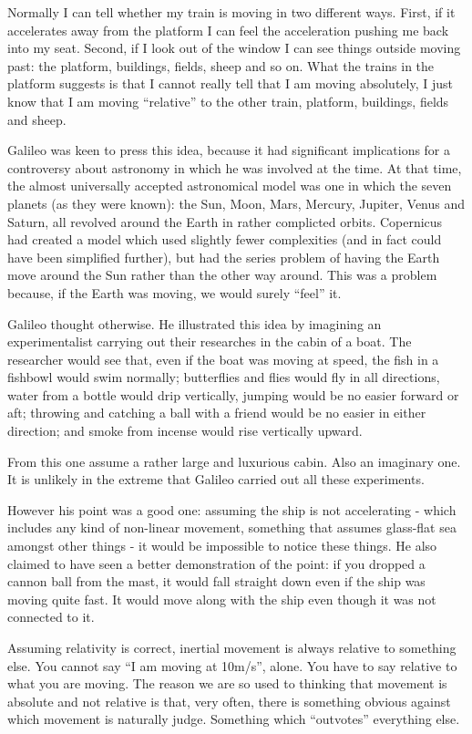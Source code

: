 \documentclass[a4paper]{report}
\begin{document}
Normally I can tell whether my train is moving in two different ways. First, if it accelerates away from the platform I can feel the acceleration pushing me back into my seat. Second, if I look out of the window I can see things outside moving past: the platform, buildings, fields, sheep and so on. What the trains in the platform suggests is that I cannot really tell that I am moving absolutely, I just know that I am moving ``relative'' to the other train, platform, buildings, fields and sheep.

Galileo was keen to press this idea, because it had significant implications for a controversy about astronomy in which he was involved at the time. At that time, the almost universally accepted astronomical model was one in which the seven planets (as they were known): the Sun, Moon, Mars, Mercury, Jupiter, Venus and Saturn, all revolved around the Earth in rather complicted orbits. Copernicus had created a model which used slightly fewer complexities (and in fact could have been simplified further), but had the series problem of having the Earth move around the Sun rather than the other way around. This was a problem because, if the Earth was moving, we would surely ``feel'' it.

Galileo thought otherwise. He illustrated this idea by imagining an experimentalist carrying out their researches in the cabin of a boat. The researcher would see that, even if the boat was moving at speed, the fish in a fishbowl would swim normally; butterflies and flies would fly in all directions, water from a bottle would drip vertically, jumping would be no easier forward or aft; throwing and catching a ball with a friend would be no easier in either direction; and smoke from incense would rise vertically upward.

From this one assume a rather large and luxurious cabin. Also an imaginary one. It is unlikely in the extreme that Galileo carried out all these experiments.

However his point was a good one: assuming the ship is not accelerating - which includes any kind of non-linear movement, something that assumes glass-flat sea amongst other things - it would be impossible to notice these things. He also claimed to have seen a better demonstration of the point: if you dropped a cannon ball from the mast, it would fall straight down even if the ship was moving quite fast. It would move along with the ship even though it was not connected to it.

Assuming relativity is correct, inertial movement is always relative to something else. You cannot say ``I am moving at 10m/s'', alone. You have to say relative to what you are moving. The reason we are so used to thinking that movement is absolute and not relative is that, very often, there is something obvious against which movement is naturally judge. Something which ``outvotes'' everything else.
\end{document}
